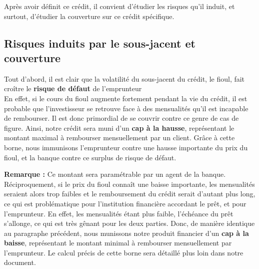 \documentclass[10pt,a4paper]{article}
\begin{document}
Après avoir définit ce crédit, il convient d'étudier les risques qu'il induit, et surtout, d'étudier la couverture sur ce crédit spécifique.

\subsection{Risques induits par le sous-jacent et couverture}
Tout d'abord, il est clair que la volatilité du sous-jacent du crédit, le fioul, fait croître le \textbf{risque de défaut} de l'emprunteur\\
En effet, si le cours du fioul augmente fortement pendant la vie du crédit, il est probable que  l'investisseur se retrouve face à des mensualités qu'il est incapable de rembourser. Il est donc primordial de se couvrir contre ce genre de cas de figure. Ainsi, notre crédit sera muni d'un \textbf{cap à la hausse}, représentant le montant maximal à rembourser mensuellement par un client. Grâce à cette borne, nous immunisons l'emprunteur contre une hausse importante du prix du fioul, et la banque contre ce surplus de risque de défaut. 

\vspace{2mm} 
\textbf{Remarque : }Ce montant sera paramétrable par un agent de la banque. \\

Réciproquement, si le prix du fioul connaît une baisse importante, les mensualités seraient alors trop faibles et le remboursement du crédit serait d'autant plus long, ce qui est problématique pour l'institution financière accordant le prêt, et pour l'emprunteur. En effet, les mensualités étant plus faible, l'échéance du prêt s'allonge, ce qui est très gênant pour les deux parties. Donc, de manière identique au paragraphe précédent, nous munissons notre produit financier d'un \textbf{cap à la baisse}, représentant le montant minimal à rembourser mensuellement par l'emprunteur. Le calcul précis de cette borne sera détaillé plus loin dans notre document. \\
\end{document}
